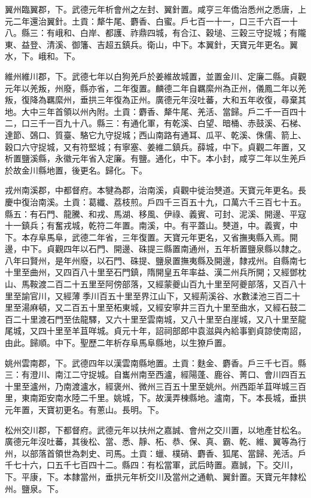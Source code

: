 \begin{pinyinscope}
 翼州臨翼郡，下。武德元年析會州之左封、翼針置。咸亨三年僑治悉州之悉唐，上元二年還治翼針。土貢：犛牛尾、麝香、白蜜。戶七百一十一，口三千六百一十八。縣三：有峨和、白岸、都護、祚鼎四城，有合江、穀塠、三穀三守捉城；有隴東、益登、清溪、御籓、吉超五鎮兵。衛山，中下。本翼針，天寶元年更名。翼水，下。峨和。下。



 維州維川郡，下。武德七年以白狗羌戶於姜維故城置，並置金川、定廉二縣。貞觀元年以羌叛，州廢，縣亦省，二年復置。麟德二年自羈縻州為正州，儀鳳二年以羌叛，復降為羈縻州，垂拱三年復為正州。廣德元年沒吐蕃，大和五年收復，尋棄其地。大中三年首領以州內附。土貢：麝香、犛牛尾、羌活、當歸。戶二千一百四十二，口三千一百九十八。縣三：有通化軍，有乾溪、白望、暗桶、赤鼓溪、石梯、達節、鵶口、質臺、駱它九守捉城；西山南路有通耳、瓜平、乾溪、侏儒、箭上、穀口六守捉城，又有符堅城；有寧塞、姜維二鎮兵。薛城，中下。貞觀二年置，又析置鹽溪縣，永徽元年省入定廉。有鹽。通化，中下。本小封，咸亨二年以生羌戶於故金川縣地置，後更名。歸化。下。



 戎州南溪郡，中都督府。本犍為郡，治南溪，貞觀中徙治僰道。天寶元年更名。長慶中復治南溪。土貢：葛纖、荔枝煎。戶四千三百五十九，口萬六千三百七十五。縣五：有石門、龍騰、和戎、馬湖、移風、伊祿、義賓、可封、泥溪、開邊、平寇十一鎮兵；有奮戎城，乾符二年置。南溪，中。有平蓋山。僰道，中。義賓，中下。本存阜馬阜，武德二年省，三年復置。天寶元年更名，又省撫夷縣入焉。開邊，中下。貞觀四年以石門、開邊、硃提三縣置南通州，五年析置鹽泉縣以隸之。八年曰賢州，是年州廢，以石門、硃提、鹽泉置撫夷縣及開邊，隸戎州。自縣南七十里至曲州，又四百八十里至石門鎮，隋開皇五年率益、漢二州兵所開；又經鄧枕山、馬鞍渡二百二十五里至阿傍部落，又經蒙夔山百九十里至阿夔部落，又百八十里至諭官川，又經薄季川百五十里至界江山下，又經荊溪谷、水數渘池三百二十里至湯麻頓，又二百五十里至柘東城，又經安寧井三百九十里至曲水，又經石鼓二百二十里渡石門至佉龍驛，又六十里至雲南城，又八十里至白崖城，又八十里至龍尾城，又四十里至羊苴咩城。貞元十年，詔祠部郎中袁滋與內給事劉貞諒使南詔，由此。歸順。中下。聖歷二年析存阜馬阜縣地，以生獠戶置。



 姚州雲南郡，下。武德四年以漢雲南縣地置。土貢：麩金、麝香。戶三千七百。縣三：有澄川、南江二守捉城。自巂州南至西瀘，經陽蓬、鹿谷、菁口、會川四百五十里至瀘州，乃南渡瀘水，經褒州、微州三百五十里至姚州。州西距羊苴咩城三百里，東南距安南水陸二千里。姚城，下。故漢弄棟縣地。瀘南，下。本長城，垂拱元年置，天寶初更名。有蔥山。長明。下。



 松州交川郡，下都督府。武德元年以扶州之嘉誠、會州之交川置，以地產甘松名。廣德元年沒吐蕃，其後松、當、悉、靜、柘、恭、保、真、霸、乾、維、翼等為行州，以部落首領世為刺史、司馬。土貢：蠟、樸硝、麝香、狐尾、當歸、羌活。戶千七十六，口五千七百四十二。縣四：有松當軍，武后時置。嘉誠，下。交川，下。平康，下。本隸當州，垂拱元年析交川及當州之通軌、翼針置。天寶元年隸松州。鹽泉。下。




\end{pinyinscope}
